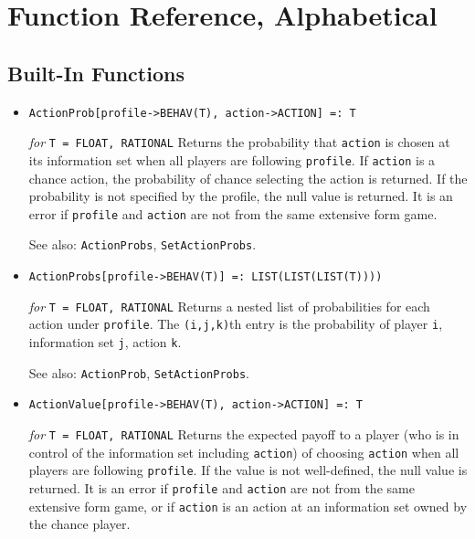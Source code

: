 \chapter{Function Reference, Alphabetical}
\pagestyle{lexicon}

\section{Built-In Functions}

\begin{itemize}



\item{}
\protect \large \begin{verbatim}
ActionProb[profile->BEHAV(T), action->ACTION] =: T
\end{verbatim}\normalsize

{\it for} {\tt T = FLOAT, RATIONAL}
\bd
Returns the probability that \verb+action+ is chosen at its
information set when all players are following \verb+profile+.
If \verb+action+ is a chance action, the probability of chance selecting
the action is returned.  If the probability is not specified by the 
profile, the null value is returned.  It is an error if \verb+profile+
and \verb+action+ are not from the same extensive form game.

\item [See also:] \verb+ActionProbs+, \verb+SetActionProbs+.
\ed

\item{}
\protect \large \begin{verbatim}
ActionProbs[profile->BEHAV(T)] =: LIST(LIST(LIST(T))))
\end{verbatim}\normalsize

{\it for} {\tt T = FLOAT, RATIONAL} 
\bd 
Returns a nested list of probabilities for each action under
\verb+profile+.  The \verb+(i,j,k)+th entry is the probability of
player \verb+i+, information set \verb+j+, action \verb+k+. 

\item [See also:] \verb+ActionProb+, \verb+SetActionProbs+.
\ed

\item{}
\protect \large \begin{verbatim}
ActionValue[profile->BEHAV(T), action->ACTION] =: T
\end{verbatim}\normalsize

{\it for} {\tt T = FLOAT, RATIONAL} 
\bd 
Returns the expected payoff to a player (who is in control of the
information set including \verb+action+) of choosing \verb+action+ when
all players are following \verb+profile+.  If the value is not
well-defined, the null value is returned.  It is an error if
\verb+profile+ and \verb+action+ are not from the same extensive form
game, or if \verb+action+ is an action at an information set owned by
the chance player.


\end{itemize}
